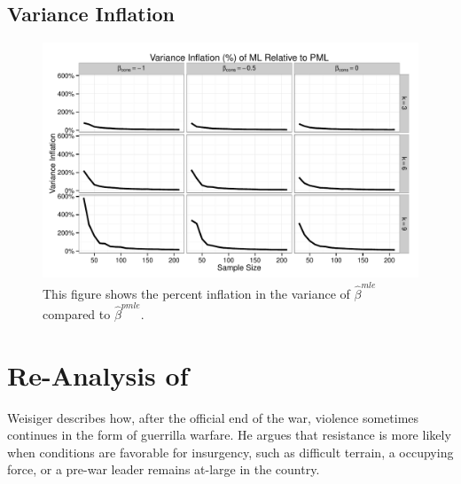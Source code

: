 \documentclass[12pt]{article}
\begin{document}
\begin{appendix}
\subsection{Variance Inflation}

\begin{figure}[H]
\begin{center}
\includegraphics[width = \textwidth]{figs/sims-var-infl.pdf}
\caption{This figure shows the percent inflation in the variance of $\hat{\beta}^{mle}$ compared to $\hat{\beta}^{pmle}$.}\label{fig:var-infl}
\end{center}
\end{figure}

\section{Re-Analysis of \cite{Weisiger2014}}\label{app:weisiger}

Weisiger describes how, after the official end of the war, violence sometimes continues in the form of guerrilla warfare.
He argues that resistance is more likely when conditions are favorable for insurgency, such as difficult terrain, a occupying force, or a pre-war leader remains at-large in the country.


\end{appendix}
\end{document}
